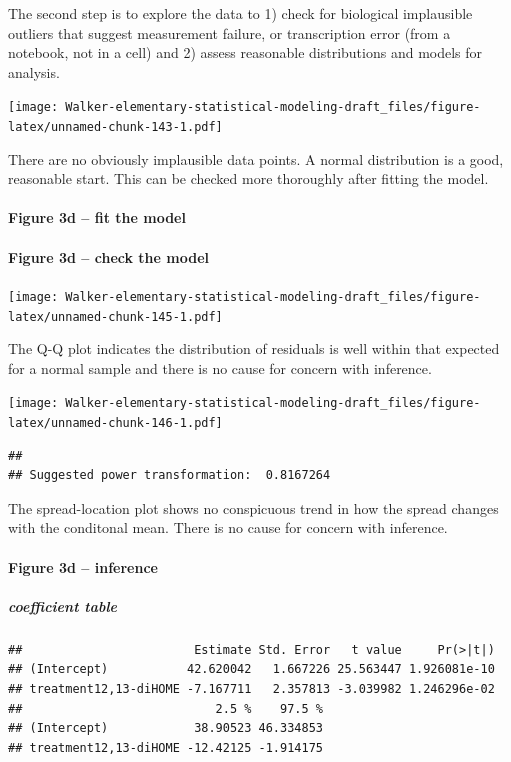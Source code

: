 \documentclass[]{book}
\let\oldparagraph\paragraph
\renewcommand{\paragraph}[1]{\oldparagraph{#1}\mbox{}}
\let\oldsubparagraph\subparagraph
\renewcommand{\subparagraph}[1]{\oldsubparagraph{#1}\mbox{}}
\begin{document}
The second step is to explore the data to 1) check for biological implausible outliers that suggest measurement failure, or transcription error (from a notebook, not in a cell) and 2) assess reasonable distributions and models for analysis.

\texttt{[image: Walker-elementary-statistical-modeling-draft\_files/figure-latex/unnamed-chunk-143-1.pdf]}

There are no obviously implausible data points. A normal distribution is a good, reasonable start. This can be checked more thoroughly after fitting the model.

\hypertarget{figure-3d-fit-the-model}{%
\paragraph{Figure 3d -- fit the model}\label{figure-3d-fit-the-model}}

\hypertarget{figure-3d-check-the-model}{%
\paragraph{Figure 3d -- check the model}\label{figure-3d-check-the-model}}

\texttt{[image: Walker-elementary-statistical-modeling-draft\_files/figure-latex/unnamed-chunk-145-1.pdf]}

The Q-Q plot indicates the distribution of residuals is well within that expected for a normal sample and there is no cause for concern with inference.

\texttt{[image: Walker-elementary-statistical-modeling-draft\_files/figure-latex/unnamed-chunk-146-1.pdf]}

\begin{verbatim}
## 
## Suggested power transformation:  0.8167264
\end{verbatim}

The spread-location plot shows no conspicuous trend in how the spread changes with the conditonal mean. There is no cause for concern with inference.

\hypertarget{figure-3d-inference}{%
\paragraph{Figure 3d -- inference}\label{figure-3d-inference}}

\hypertarget{coefficient-table}{%
\subparagraph{coefficient table}\label{coefficient-table}}

\begin{verbatim}
##                        Estimate Std. Error   t value     Pr(>|t|)
## (Intercept)           42.620042   1.667226 25.563447 1.926081e-10
## treatment12,13-diHOME -7.167711   2.357813 -3.039982 1.246296e-02
##                           2.5 %    97.5 %
## (Intercept)            38.90523 46.334853
## treatment12,13-diHOME -12.42125 -1.914175
\end{verbatim}
\end{document}
